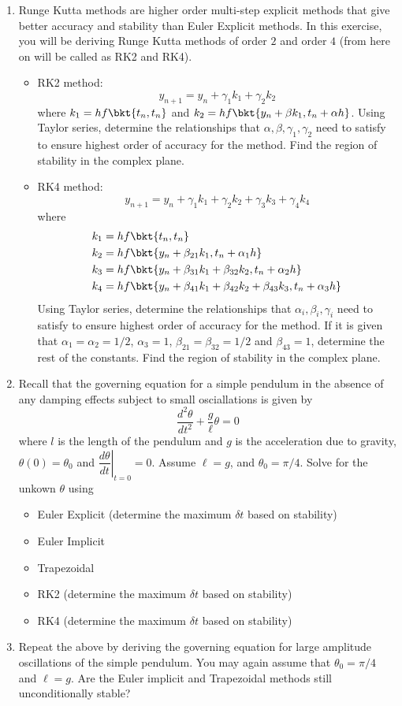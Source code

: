 \documentclass{article}
\begin{document}
	\begin{enumerate}
		\item
		Runge Kutta methods are higher order multi-step explicit methods that give better accuracy and stability than Euler Explicit methods. In this exercise, you will be deriving Runge Kutta methods of order $2$ and order $4$ (from here on will be called as RK2 and RK4).
		\begin{itemize}
			\item
			RK2 method:
			$$y_{n+1} = y_n + \gamma_1 k_1 + \gamma_2 k_2$$
			where $k_1 = h f\bkt{t_n,t_n}$ and $k_2 = h f\bkt{y_n+\beta k_1, t_n + \alpha h}$. Using Taylor series, determine the relationships that $\alpha, \beta,\gamma_1,\gamma_2$ need to satisfy to ensure highest order of accuracy for the method. Find the region of stability in the complex plane.
			\item
			RK4 method:
			$$y_{n+1} = y_n + \gamma_1 k_1 + \gamma_2 k_2 + \gamma_3 k_3 + \gamma_4 k_4$$
			where
			\begin{align}
				k_1 & = h f\bkt{t_n,t_n}\\
				k_2 & = h f\bkt{y_n+\beta_{21} k_1, t_n + \alpha_1 h}\\
				k_3 & = h f\bkt{y_n+\beta_{31} k_1+\beta_{32} k_2, t_n + \alpha_2h}\\
				k_4 & = h f\bkt{y_n+\beta_{41} k_1+\beta_{42} k_2+\beta_{43} k_3, t_n + \alpha_3 h}
			\end{align}
			Using Taylor series, determine the relationships that $\alpha_i, \beta_i, \gamma_i$ need to satisfy to ensure highest order of accuracy for the method. If it is given that $\alpha_1 = \alpha_2 = 1/2$, $\alpha_3=1$, $\beta_{21}=\beta_{32}=1/2$ and $\beta_{43}=1$, determine the rest of the constants. Find the region of stability in the complex plane.
		\end{itemize}
		\item
		Recall that the governing equation for a simple pendulum in the absence of any damping effects subject to small osciallations is given by
		$$\dfrac{d^2 \theta}{dt^2} + \dfrac{g}{\ell}\theta = 0$$
		where $l$ is the length of the pendulum and $g$ is the acceleration due to gravity, $\theta(0) = \theta_0$ and $\left. \dfrac{d\theta}{dt} \right \vert_{t=0} = 0$. Assume $\ell=g$, and $\theta_0 = \pi/4$. Solve for the unkown $\theta$ using
		\begin{itemize}
			\item
			Euler Explicit (determine the maximum $\delta t$ based on stability)
			\item
			Euler Implicit
			\item
			Trapezoidal
			\item
			RK2 (determine the maximum $\delta t$ based on stability)
			\item
			RK4 (determine the maximum $\delta t$ based on stability)
		\end{itemize}
		\item
		Repeat the above by deriving the governing equation for large amplitude oscillations of the simple pendulum. You may again assume that $\theta_0=\pi/4$ and $\ell=g$. Are the Euler implicit and Trapezoidal methods still unconditionally stable?
	\end{enumerate}
\end{document}
